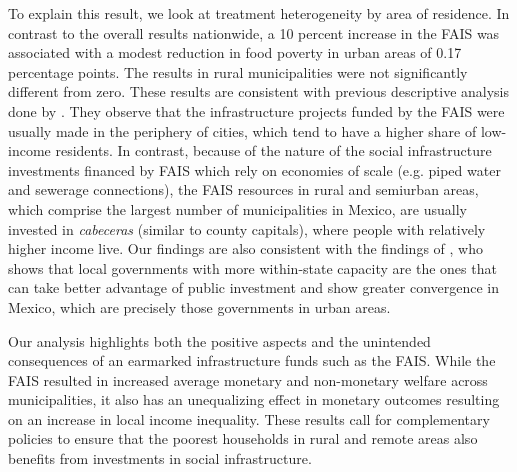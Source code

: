 \documentclass[dv_diss_main.tex]{subfiles}
\begin{document}
To explain this result, we look at treatment heterogeneity by area of residence. In contrast to the overall results nationwide, a 10 percent increase in the FAIS was associated with a modest reduction in food poverty in urban areas of 0.17 percentage points. The results in rural municipalities were not significantly different from zero. These results are consistent with previous descriptive analysis done by \cite{wellenstein2006social}. They observe that the infrastructure projects funded by the FAIS were usually made in the periphery of cities, which tend to have a higher share of low-income residents. In contrast, because of the nature of the social infrastructure investments financed by FAIS which rely on economies of scale (e.g. piped water  and sewerage connections), the FAIS resources in rural and semiurban areas, which comprise the largest number of municipalities in Mexico, are usually invested in \textit{cabeceras} (similar to county capitals), where people with relatively higher income live. Our findings are also consistent with the findings of \cite{smith2018aumento}, who shows that local governments with more within-state capacity are the ones that can take better advantage of public investment and show greater convergence in Mexico, which are precisely those governments in urban areas.

Our analysis highlights both the positive aspects and the unintended consequences of an earmarked infrastructure funds such as the FAIS. While the FAIS resulted in increased average monetary and non-monetary welfare across municipalities, it also has an unequalizing effect in monetary outcomes resulting on an increase in local income inequality. These results call for complementary policies to ensure that the poorest households in rural and remote areas also benefits from investments in social infrastructure.
\end{document}
